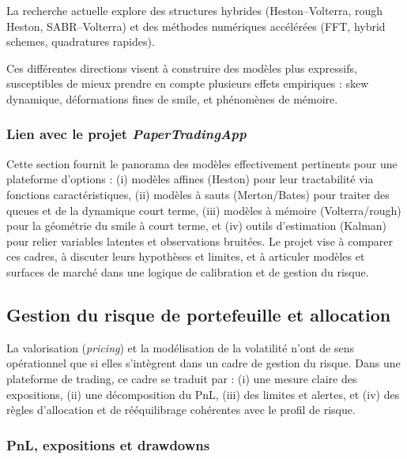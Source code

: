 \documentclass[11pt,a4paper]{article}
\newcommand{\1}{\mathbf{1}}
\begin{document}
La recherche actuelle explore des structures hybrides (Heston--Volterra,
rough Heston, SABR--Volterra) et des méthodes numériques accélérées (FFT,
hybrid schemes, quadratures rapides).

Ces diff\'erentes directions visent \`a construire des mod\`eles plus expressifs, susceptibles de mieux prendre en compte
plusieurs effets empiriques : skew dynamique, d\'eformations fines de smile, et ph\'enom\`enes de m\'emoire.





\subsubsection{Lien avec le projet \emph{PaperTradingApp}}

Cette section fournit le panorama des mod\`eles effectivement pertinents pour une plateforme d'options : (i) mod\`eles affines (Heston) pour
leur tractabilit\'e via fonctions caract\'eristiques, (ii) mod\`eles \`a sauts (Merton/Bates) pour traiter des queues et de la dynamique court terme,
(iii) mod\`eles \`a m\'emoire (Volterra/rough) pour la g\'eom\'etrie du smile \`a court terme, et (iv) outils d'estimation (Kalman) pour relier variables
latentes et observations bruit\'ees. Le projet vise \`a comparer ces cadres, \`a discuter leurs hypoth\`eses et limites, et \`a articuler mod\`eles et
surfaces de march\'e dans une logique de calibration et de gestion du risque.

\subsection{Gestion du risque de portefeuille et allocation}

La valorisation (\emph{pricing}) et la mod\'elisation de la volatilit\'e n'ont de sens op\'erationnel que si elles
s'int\`egrent dans un cadre de gestion du risque. Dans une plateforme de trading, ce cadre se traduit par :
(i) une mesure claire des expositions, (ii) une d\'ecomposition du PnL, (iii) des limites et alertes, et
(iv) des r\`egles d'allocation et de r\'e\'equilibrage coh\'erentes avec le profil de risque.

\subsubsection{PnL, expositions et drawdowns}
\end{document}
